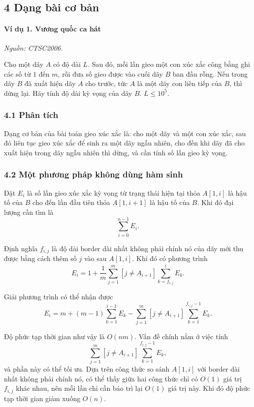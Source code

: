 \documentclass[11pt]{article}
\begin{document}
\subsection*{4 Dạng bài cơ bản}

\paragraph{Ví dụ 1. Vương quốc ca hát}
\noindent\emph{Nguồn: CTSC2006.}

Cho một dãy \(A\) có độ dài \(L\). Sau đó, mỗi lần gieo một con xúc xắc công
bằng ghi các số từ \(1\) đến \(m\), rồi đưa số gieo được vào cuối dãy \(B\) ban
đầu rỗng. Nếu trong dãy \(B\) đã xuất hiện dãy \(A\) cho trước, tức \(A\) là một
dãy con liên tiếp của \(B\), thì dừng lại. Hãy tính độ dài kỳ vọng của dãy
\(B\). \(L\le 10^5\).

\subsubsection*{4.1 Phân tích}

Dạng cơ bản của bài toán gieo xúc xắc là: cho một dãy và một con xúc xắc, sau đó
liên tục gieo xúc xắc để sinh ra một dãy ngẫu nhiên, cho đến khi dãy đã cho
xuất hiện trong dãy ngẫu nhiên thì dừng, và cần tính số lần gieo kỳ vọng.

\subsubsection*{4.2 Một phương pháp không dùng hàm sinh}

Đặt \(E_i\) là số lần gieo xúc xắc kỳ vọng từ trạng thái hiện tại thỏa
\(A[1,i]\) là hậu tố của \(B\) cho đến lần đầu tiên thỏa \(A[1,i+1]\) là hậu tố
của \(B\). Khi đó đại lượng cần tìm là
\[
  \sum_{i=0}^{n-1} E_i .
\]

Định nghĩa \(f_{i,j}\) là độ dài border dài nhất không phải chính nó của dãy mới
thu được bằng cách thêm số \(j\) vào sau \(A[1,i]\). Khi đó có phương trình
\[
  E_i=1+\frac{1}{m}\sum_{j=1}^{m}[j\ne A_{i+1}]
      \sum_{k=f_{i,j}}^{i}E_k .
\]

Giải phương trình có thể nhận được
\[
  E_i=m+(m-1)\sum_{k=1}^{i-1}E_k
      -\sum_{j=1}^{m}[j\ne A_{i+1}]
       \sum_{k=1}^{f_{i,j}-1}E_k .
\]

Độ phức tạp thời gian như vậy là \(O(nm)\). Vấn đề chính nằm ở việc tính
\[
  \sum_{j=1}^{m}[j\ne A_{i+1}]
  \sum_{k=1}^{f_{i,j}-1}E_k,
\]
và phần này có thể tối ưu. Dựa trên công thức so sánh \(A[1,i]\) với border dài
nhất không phải chính nó, có thể thấy giữa hai công thức chỉ có \(O(1)\) giá trị
\(f_{i,j}\) khác nhau, nên mỗi lần chỉ cần bảo trì lại \(O(1)\) giá trị này. Khi
đó độ phức tạp thời gian giảm xuống \(O(n)\).
\end{document}

